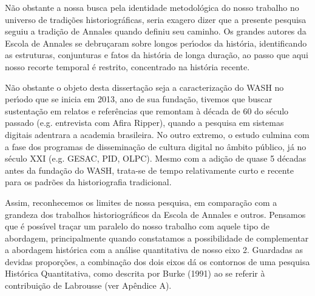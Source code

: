 \documentclass[
12pt,		%
openright,	%
twoside,  %
a4paper,			%
chapter=TITLE,		%
english,			%
french,				%
spanish,			%
brazil				%
]{USPSC-classe/USPSC}
\begin{document}
N\~ao obstante a nossa busca pela identidade metodol\'ogica do nosso trabalho no universo de tradi\c{c}\~oes historiogr\'aficas, seria exagero dizer que a presente pesquisa seguiu a tradi\c{c}\~ao de Annales quando definiu seu caminho.  Os grandes autores da Escola de Annales se debru\c{c}aram sobre longos per\'{\i}odos da hist\'oria, identificando as estruturas, conjunturas e fatos da \textquotedbl hist\'oria de longa dura\c{c}\~ao\textquotedbl , ao passo que aqui nosso recorte temporal \'e restrito, concentrado na hist\'oria recente.

















N\~ao obstante o objeto desta disserta\c{c}\~ao seja a caracteriza\c{c}\~ao do WASH no per\'{\i}odo que se inicia em 2013, ano de sua funda\c{c}\~ao, tivemos que buscar sustenta\c{c}\~ao em relatos e refer\^encias que remontam \`a d\'ecada de 60 do s\'eculo passado (e.g. entrevista com Afira Ripper), quando a pesquisa em sistemas digitais adentrara a academia brasileira. No outro extremo, o estudo culmina com a fase dos programas de dissemina\c{c}\~ao de cultura digital no \^ambito p\'ublico, j\'a no s\'eculo XXI (e.g. GESAC, PID, OLPC).  Mesmo com a adi\c{c}\~ao de quase 5 d\'ecadas antes da funda\c{c}\~ao do WASH, trata-se de tempo relativamente curto e recente para os padr\~oes da historiografia tradicional.

















Assim, reconhecemos os limites de nossa pesquisa, em compara\c{c}\~ao com a grandeza dos trabalhos historiogr\'aficos da Escola de Annales e outros. Pensamos que \'e poss\'{\i}vel tra\c{c}ar um paralelo do nosso trabalho com aquele tipo de abordagem, principalmente quando constatamos a possibilidade de complementar a abordagem hist\'orica com a an\'alise quantitativa de nosso eixo 2. Guardadas as devidas propor\c{c}\~oes, a combina\c{c}\~ao dos dois eixos d\'a os contornos de uma pesquisa Hist\'orica Quantitativa, como descrita por  Burke (1991) ao se referir \`a contribui\c{c}\~ao de Labrousse (ver Ap\^endice A).
\end{document}
